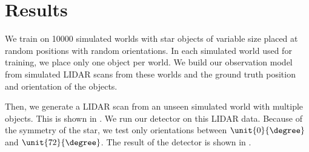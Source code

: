\section{Results}

We train on 10000 simulated worlds with star objects of variable size placed at
random positions with random orientations. In each simulated world used for
training, we place only one object per world. We build our observation model
from simulated LIDAR scans from these worlds and the ground truth position and
orientation of the objects.

Then, we generate a LIDAR scan from an unseen simulated world with multiple
objects. This is shown in . We run our detector on this
LIDAR data. Because of the symmetry of the star, we test only orientations
between $\unit{0}{\degree}$ and $\unit{72}{\degree}$. The result of the detector
is shown in .

